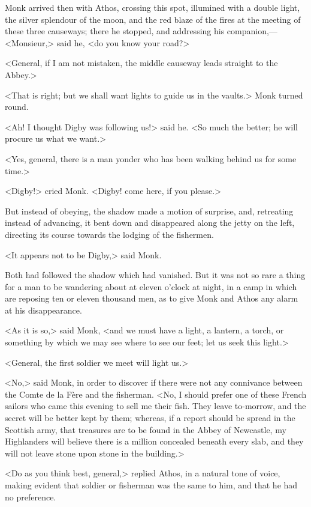Monk arrived then with Athos, crossing this spot, illumined with a double light, the silver splendour of the moon, and the red blaze of the fires at the meeting of these three causeways; there he stopped, and addressing his companion,—<Monsieur,> said he, <do you know your road?>

<General, if I am not mistaken, the middle causeway leads straight to the Abbey.>

<That is right; but we shall want lights to guide us in the vaults.> Monk turned round.

<Ah! I thought Digby was following us!> said he. <So much the better; he will procure us what we want.>

<Yes, general, there is a man yonder who has been walking behind us for some time.>

<Digby!> cried Monk. <Digby! come here, if you please.>

But instead of obeying, the shadow made a motion of surprise, and, retreating instead of advancing, it bent down and disappeared along the jetty on the left, directing its course towards the lodging of the fishermen.

<It appears not to be Digby,> said Monk.

Both had followed the shadow which had vanished. But it was not so rare a thing for a man to be wandering about at eleven o'clock at night, in a camp in which are reposing ten or eleven thousand men, as to give Monk and Athos any alarm at his disappearance.

<As it is so,> said Monk, <and we must have a light, a lantern, a torch, or something by which we may see where to see our feet; let us seek this light.>

<General, the first soldier we meet will light us.>

<No,> said Monk, in order to discover if there were not any connivance between the Comte de la Fère and the fisherman. <No, I should prefer one of these French sailors who came this evening to sell me their fish. They leave to-morrow, and the secret will be better kept by them; whereas, if a report should be spread in the Scottish army, that treasures are to be found in the Abbey of Newcastle, my Highlanders will believe there is a million concealed beneath every slab, and they will not leave stone upon stone in the building.>

<Do as you think best, general,> replied Athos, in a natural tone of voice, making evident that soldier or fisherman was the same to him, and that he had no preference.

